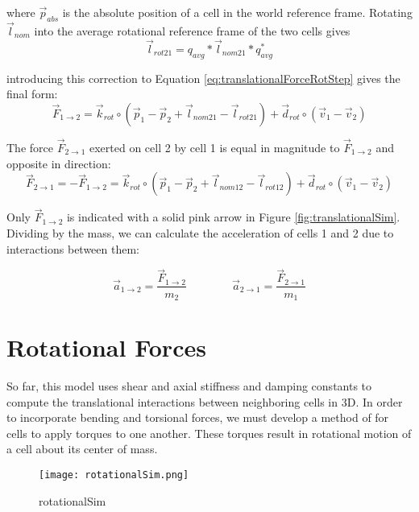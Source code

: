 { where $\vec{p}_{abs}$ is the absolute position of a cell in the world reference frame.
 Rotating $\vec{l}_{nom}$ into the average rotational reference frame of the two cells gives
 \[\vec{l}_{rot21} = q_{avg}*\vec{l}_{nom21}*q_{avg}^*\]
 
introducing this correction to Equation \ref{eq:translationalForceRotStep} gives the final form:
 \begin{equation} \label{eq:translationalForceRot}
  \vec{F}_{1\rightarrow2} = \vec{k}_{rot} \circ (\vec{p}_1 - \vec{p}_2 + \vec{l}_{nom21}-\vec{l}_{rot21}) + \vec{d}_{rot} \circ (\vec{v}_1 - \vec{v}_2)
  \end{equation}

The force $\vec{F}_{2\rightarrow1}$ exerted on cell 2 by cell 1 is equal in magnitude to $\vec{F}_{1\rightarrow2}$ and opposite in direction:
 \begin{equation} \label{eq:translationalEqOpp}
  \vec{F}_{2\rightarrow1} = -\vec{F}_{1\rightarrow2} = \vec{k}_{rot} \circ (\vec{p}_1 - \vec{p}_2 + \vec{l}_{nom12}-\vec{l}_{rot12}) + \vec{d}_{rot} \circ (\vec{v}_1 - \vec{v}_2)
  \end{equation}

Only $\vec{F}_{1\rightarrow2}$ is indicated with a solid pink arrow in Figure \ref{fig:translationalSim}.\\

Dividing by the mass, we can calculate the acceleration of cells 1 and 2 due to interactions between them:

 \[ \vec{a}_{1\rightarrow2} = \dfrac{\vec{F}_{1\rightarrow2}}{m_2} 
  \qquad\qquad
   \vec{a}_{2\rightarrow1} = \dfrac{\vec{F}_{2\rightarrow1}}{m_1} 
  \]

\section{Rotational Forces}

So far, this model uses shear and axial stiffness and damping constants to compute the translational interactions between neighboring cells in 3D.  In order to incorporate bending and torsional forces, we must develop a method of for cells to apply torques to one another.  These torques result in rotational motion of a cell about its center of mass.\\

\begin{figure}
  \texttt{[image: rotationalSim.png]}
  \caption{rotationalSim}
  \label{fig:rotationalSim}
\end{figure}

}
